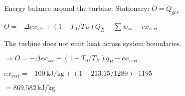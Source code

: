 Energy balance around the turbine:  
Stationary: \( O = \dot{Q}_{ges} \)  

\( O = -\Delta ex_{str} + (1 - T_0 / T_B) \dot{Q}_B - \sum \dot{w}_{in} - ex_{verl} \)  

The turbine does not emit heat across system boundaries.  

\( \Rightarrow O = -\Delta ex_{str} + (1 - T_0 / T_B) q_B - ex_{verl} \)  

\( ex_{verl} = -100 \, \text{kJ/kg} + (1 - 213.15 / 1289) \cdot 1195 \)  

\( = 869.582 \, \text{kJ/kg} \)